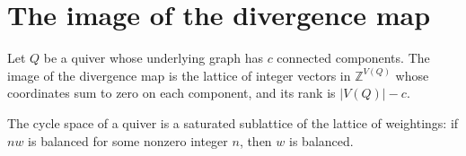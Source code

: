 \section{The image of the divergence map}\label{Arden24-sec-2}

\begin{proposition}\label{Arden24-prop-2.1}
\label{Arden24-prop:image}
Let $Q$ be a quiver whose underlying graph has $c$ connected components. The image of the divergence map is the lattice of integer vectors in $\mathbb{Z}^{V(Q)}$ whose coordinates sum to zero on each component, and its rank is $|V(Q)| - c$.
\end{proposition}

\begin{lemma}\label{Arden24-lem-2.2}
\label{Arden24-lem:saturated}
The cycle space of a quiver is a saturated sublattice of the lattice of weightings: if $nw$ is balanced for some nonzero integer $n$, then $w$ is balanced.
\end{lemma}

